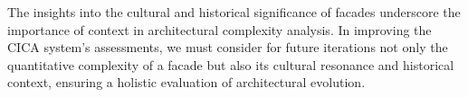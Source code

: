 


The insights into the cultural and historical significance of facades underscore the importance of context in architectural complexity analysis.
In improving the CICA system's assessments, we must consider for future iterations not only the quantitative complexity of a facade but also its cultural resonance and historical context, ensuring a holistic evaluation of architectural evolution.





